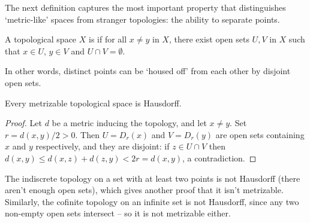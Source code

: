 \documentclass[a4paper]{scrartcl}
\begin{document}
The next definition captures the most important property that distinguishes `metric-like' spaces from stranger topologies: the ability to separate points.

\begin{definition}[Hausdorff]
    A topological space $X$ is  if for all $x \neq y$ in $X$, there exist open sets $U, V$ in $X$ such that $x \in U$, $y \in V$ and $U \cap V = \emptyset$.
\end{definition}

In other words, distinct points can be `housed off' from each other by disjoint open sets.

\begin{center}
\end{center}

\begin{proposition}
    Every metrizable topological space is Hausdorff.
\end{proposition}
\begin{proof}
    Let $d$ be a metric inducing the topology, and let $x \neq y$. Set $r = d(x, y)/2 > 0$. Then $U = D_r(x)$ and $V = D_r(y)$ are open sets containing $x$ and $y$ respectively, and they are disjoint: if $z \in U \cap V$ then $d(x, y) \leq d(x, z) + d(z, y) < 2r = d(x, y)$, a contradiction.
\end{proof}

\begin{example}
    The indiscrete topology on a set with at least two points is not Hausdorff (there aren't enough open sets), which gives another proof that it isn't metrizable. Similarly, the cofinite topology on an infinite set is not Hausdorff, since any two non-empty open sets intersect -- so it is not metrizable either.
\end{example}
\end{document}

